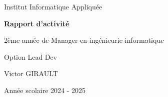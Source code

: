 \documentclass[12pt]{article}
\begin{document}
\begin{titlepage}
    \centering
    {\Huge Institut Informatique Appliquée\par}
    \vspace*{6cm}
    {\Huge \textbf{Rapport d'activité}}\par
    \vspace{.5cm}
    {\LARGE 2ème année de Manager en ingénieurie informatique}\par
    \vspace{0.4cm}
    {\Large Option Lead Dev}\par
    \vspace{9cm}
    {\Large Victor GIRAULT\par}
    \vspace{1cm}
    \vfill
    {\Large Année scolaire 2024 - 2025\par}
\end{titlepage}

\newpage
\tableofcontents
\thispagestyle{empty}
\newpage
\listoffigures
\thispagestyle{empty}
\newpage
\setcounter{page}{1}
\end{document}
